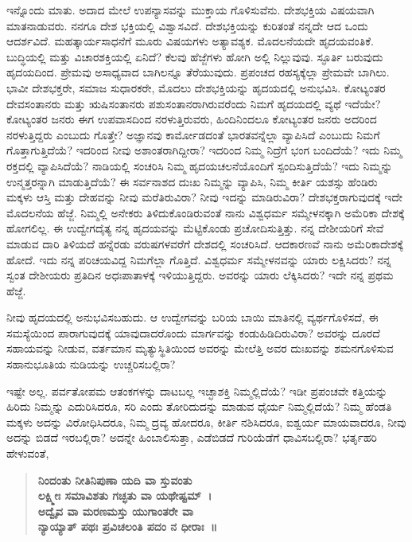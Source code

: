ಇನ್ನೊಂದು ಮಾತು. ಅದಾದ ಮೇಲೆ ಉಪನ್ಯಾಸವನ್ನು ಮುಕ್ತಾಯ ಗೊಳಿಸುವೆನು. ದೇಶಭಕ್ತಿಯ ವಿಷಯವಾಗಿ ಮಾತನಾಡುವರು. ನನಗೂ ದೇಶ ಭಕ್ತಿಯಲ್ಲಿ ವಿಶ್ವಾಸವಿದೆ. ದೇಶಭಕ್ತಿಯನ್ನು ಕುರಿತಂತೆ ನನ್ನದೇ ಆದ ಒಂದು ಆದರ್ಶವಿದೆ. ಮಹತ್ಕಾರ್ಯಸಾಧನೆಗೆ ಮೂರು ವಿಷಯಗಳು ಅತ್ಯಾವಶ್ಯಕ. ಮೊದಲನೆಯದೇ ಹೃದಯವಂತಿಕೆ. ಬುದ್ಧಿಯಲ್ಲಿ ಮತ್ತು ವಿಚಾರಶಕ್ತಿಯಲ್ಲಿ ಏನಿದೆ? ಕೆಲವು ಹೆಜ್ಜೆಗಳು ಹೋಗಿ ಅಲ್ಲಿ ನಿಲ್ಲುವುವು. ಸ್ಫೂರ್ತಿ ಬರುವುದು ಹೃದಯದಿಂದ. ಪ್ರೇಮವು ಅಸಾಧ್ಯವಾದ ಬಾಗಿಲನ್ನೂ ತೆರೆಯುವುದು. ಪ್ರಪಂಚದ ರಹಸ್ಯಕ್ಕೆಲ್ಲಾ ಪ್ರೇಮವೇ ಬಾಗಿಲು. ಭಾವೀ ದೇಶಭಕ್ತರೇ, ಸಮಾಜ ಸುಧಾರಕರೇ, ಮೊದಲು ದೇಶಭಕ್ತಿಯನ್ನು ಹೃದಯದಲ್ಲಿ ಅನುಭವಿಸಿ. ಕೋಟ್ಯಂತರ ದೇವಸಂತಾನರು ಮತ್ತು ಋಷಿಸಂತಾನರು ಪಶುಸಂತಾನರಾಗಿರುವರೆಂದು ನಿಮಗೆ ಹೃದಯದಲ್ಲಿ ವ್ಯಥೆ ಇದೆಯೇ? ಕೋಟ್ಯಂತರ ಜನರು ಈಗ ಉಪವಾಸದಿಂದ ನರಳುತ್ತಿರುವರು, ಹಿಂದಿನಿಂದಲೂ ಕೋಟ್ಯಂತರ ಜನರು ಅದರಿಂದ ನರಳುತ್ತಿದ್ದರು ಎಂಬುದು ಗೊತ್ತೇ? ಅಜ್ಞಾನವು ಕಾರ್ಮೋಡದಂತೆ ಭಾರತವನ್ನೆಲ್ಲಾ ವ್ಯಾಪಿಸಿದೆ ಎಂಬುದು ನಿಮಗೆ ಗೊತ್ತಾಗುತ್ತಿದೆಯೆ? ಇದರಿಂದ ನೀವು ಅಶಾಂತರಾಗಿದ್ದೀರಾ? ಇದರಿಂದ ನಿಮ್ಮ ನಿದ್ರೆಗೆ ಭಂಗ ಬಂದಿದೆಯೆ? ಇದು ನಿಮ್ಮ ರಕ್ತದಲ್ಲಿ ವ್ಯಾಪಿಸಿದೆಯೆ? ನಾಡಿಯಲ್ಲಿ ಸಂಚರಿಸಿ ನಿಮ್ಮ ಹೃದಯಚಲನೆಯೊಂದಿಗೆ ಸ್ಪಂದಿಸುತ್ತಿದೆಯೆ? ಇದು ನಿಮ್ಮನ್ನು ಉನ್ಮತ್ತರನ್ನಾಗಿ ಮಾಡುತ್ತಿದೆಯೆ? ಈ ಸರ್ವನಾಶದ ದುಃಖ ನಿಮ್ಮನ್ನು ವ್ಯಾಪಿಸಿ, ನಿಮ್ಮ ಕೀರ್ತಿ ಯಶಸ್ಸು ಹೆಂಡಿರು ಮಕ್ಕಳು ಆಸ್ತಿ ಮತ್ತು ದೇಹವನ್ನು ನೀವು ಮರೆತಿರುವಿರಾ? ನೀವು ಇದನ್ನು ಮಾಡಿರುವಿರಾ? ದೇಶಭಕ್ತರಾಗುವುದಕ್ಕೆ ಇದೇ ಮೊದಲನೆಯ ಹೆಜ್ಜೆ. ನಿಮ್ಮಲ್ಲಿ ಅನೇಕರು ತಿಳಿದುಕೊಂಡಿರುವಂತೆ ನಾನು ವಿಶ್ವಧರ್ಮ ಸಮ್ಮೇಳನಕ್ಕಾಗಿ ಅಮೆರಿಕಾ ದೇಶಕ್ಕೆ ಹೋಗಲಿಲ್ಲ. ಈ ಉದ್ವೇಗದೈತ್ಯ ನನ್ನ ಹೃದಯವನ್ನು ಮೆಟ್ಟಿಕೊಂಡು ಪ್ರಚೋದಿಸುತ್ತಿತ್ತು. ನನ್ನ ದೇಶೀಯರಿಗೆ ಸೇವೆ ಮಾಡುವ ದಾರಿ ತಿಳಿಯದೆ ಹನ್ನೆರಡು ವರುಷಗಳವರೆಗೆ ದೇಶದಲ್ಲಿ ಸಂಚರಿಸಿದೆ. ಆದಕಾರಣವೆ ನಾನು ಅಮೆರಿಕಾದೇಶಕ್ಕೆ ಹೋದೆ. ಇದು ನನ್ನ ಪರಿಚಯವಿದ್ದ ನಿಮಗೆಲ್ಲಾ ಗೊತ್ತಿದೆ. ವಿಶ್ವಧರ್ಮ ಸಮ್ಮೇಳನವನ್ನು ಯಾರು ಲಕ್ಷಿಸಿದರು? ನನ್ನ ಸ್ವಂತ ದೇಶೀಯರು ಪ್ರತಿದಿನ ಅಧಃಪಾತಾಳಕ್ಕೆ ಇಳಿಯುತ್ತಿದ್ದರು. ಅವರನ್ನು ಯಾರು ಲೆಕ್ಕಿಸಿದರು? ಇದೇ ನನ್ನ ಪ್ರಥಮ ಹೆಜ್ಜೆ.

ನೀವು ಹೃದಯದಲ್ಲಿ ಅನುಭವಿಸಬಹುದು. ಆ ಉದ್ವೇಗವನ್ನು ಬರಿಯ ಬಾಯಿ ಮಾತಿನಲ್ಲಿ ವ್ಯರ್ಥಗೊಳಿಸದೆ, ಈ ಸಮಸ್ಯೆಯಿಂದ ಪಾರಾಗುವುದಕ್ಕೆ ಯಾವುದಾದರೊಂದು ಮಾರ್ಗವನ್ನು ಕಂಡುಹಿಡಿದಿರುವಿರಾ? ಅವರನ್ನು ದೂರದೆ ಸಹಾಯವನ್ನು ನೀಡುವ, ವರ್ತಮಾನ ಮೃತ್ಯುಸ್ಥಿತಿಯಿಂದ ಅವರನ್ನು ಮೇಲೆತ್ತಿ ಅವರ ದುಃಖವನ್ನು ಶಮನಗೊಳಿಸುವ ಸಹಾನುಭೂತಿಯ ನುಡಿಯನ್ನು ಉಚ್ಚರಿಸಬಲ್ಲಿರಾ?

ಇಷ್ಟೇ ಅಲ್ಲ. ಪರ್ವತೋಪಮ ಆತಂಕಗಳನ್ನು ದಾಟಬಲ್ಲ ಇಚ್ಛಾಶಕ್ತಿ ನಿಮ್ಮಲ್ಲಿದೆಯೆ? ಇಡೀ ಪ್ರಪಂಚವೇ ಕತ್ತಿಯನ್ನು ಹಿರಿದು ನಿಮ್ಮನ್ನು ಎದುರಿಸಿದರೂ, ಸರಿ ಎಂದು ತೋರಿದುದನ್ನು ಮಾಡುವ ಧೈರ್ಯ ನಿಮ್ಮಲ್ಲಿದೆಯೆ? ನಿಮ್ಮ ಹೆಂಡತಿ ಮಕ್ಕಳು ಅದನ್ನು ವಿರೋಧಿಸಿದರೂ, ನಿಮ್ಮ ದ್ರವ್ಯ ಹೋದರೂ, ಕೀರ್ತಿ ನಶಿಸಿದರೂ, ಐಶ್ವರ್ಯ ಮಾಯವಾದರೂ, ನೀವು ಅದನ್ನು ಬಿಡದೆ ಇರಬಲ್ಲಿರಾ? ಅದನ್ನೇ ಹಿಂಬಾಲಿಸುತ್ತಾ, ಎಡೆಬಿಡದೆ ಗುರಿಯೆಡೆಗೆ ಧಾವಿಸಬಲ್ಲಿರಾ? ಭರ್ತೃಹರಿ ಹೇಳುವಂತೆ,

\begin{verse}
\textbf{ನಿಂದಂತು ನೀತಿನಿಪುಣಾ ಯದಿ ವಾ ಸ್ತುವಂತು}\\\textbf{ಲಕ್ಷ್ಮೀಃ ಸಮಾವಿಶತು ಗಚ್ಛತು ವಾ ಯಥೇಷ್ಟಮ್​~।}\\\textbf{ಅದ್ವೈವ ವಾ ಮರಣಮಸ್ತು ಯುಗಾಂತರೇ ವಾ}\\\textbf{ನ್ಯಾಯ್ಯಾತ್​ ಪಥಃ ಪ್ರವಿಚಲಂತಿ ಪದಂ ನ ಧೀರಾಃ~॥}
\end{verse}

